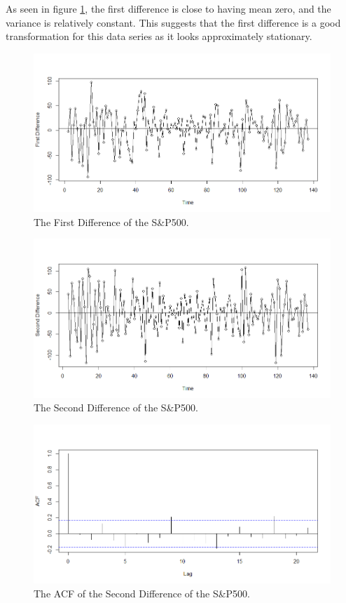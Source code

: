 \documentclass[12pt, centerh1]{article}
\begin{document}
As seen in figure \ref{fig:first_difference}, the first difference is close to having mean zero, and the variance is relatively constant. This suggests that the first difference is a good transformation for this data series as it looks approximately stationary. 
\begin{figure}[H]
    \centering
    \includegraphics[width=\linewidth]{imgs/first_difference.png}
    \caption{The First Difference of the S\&P500.}
    \label{fig:first_difference}
\end{figure}

\begin{figure}[H]
    \centering
    \includegraphics[width=\linewidth]{imgs/second_difference.png}
    \caption{The Second Difference of the S\&P500.}
    \label{fig:second_difference}
\end{figure}

\begin{figure}[H]
    \centering
    \includegraphics[width=\linewidth]{imgs/acf_first.png}
    \caption{The ACF of the Second Difference of the S\&P500.}
    \label{fig:second_difference}
\end{figure}
\end{document}
